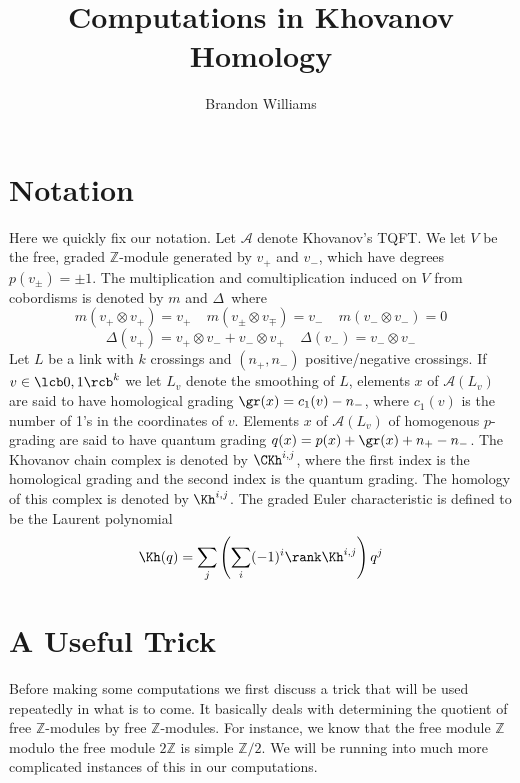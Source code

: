









\title{\Large Computations in Khovanov Homology}
\author{\large Brandon Williams}

\maketitle


\section{Notation}


Here we quickly fix our notation. Let $\mathcal A$ denote Khovanov's TQFT. We let $V$ be the free, graded $\mathbb Z$-module generated by $v_+$ and $v_-$, which have degrees $p(v_\pm) = \pm 1$. The multiplication and comultiplication induced on $V$ from cobordisms is denoted by $m$ and $\Delta$\, where
\[ m(v_+ \otimes v_+) = v_+ \ \ \ \ \ m(v_\pm \otimes v_\mp) = v_- \ \ \ \ \ m(v_- \otimes v_-) = 0 \]
\[ \Delta(v_+) = v_+ \otimes v_- + v_- \otimes v_+ \ \ \ \ \ \Delta(v_-) = v_- \otimes v_- \]
Let $L$ be a link with $k$ crossings and $(n_+,n_-)$ positive/negative crossings. If $v \in \lcb 0,1 \rcb^k$ we let $L_v$ denote the smoothing of $L$, elements $x$ of $\mathcal A(L_v)$ are said to have homological grading $\gr(x) = c_1(v) - n_-$, where $c_1(v)$ is the number of 1's in the coordinates of $v$. Elements $x$ of $\mathcal A(L_v)$ of homogenous $p$-grading are said to have quantum grading $q(x) = p(x) + \gr(x) + n_+ - n_-$. The Khovanov chain complex is denoted by $\CKh^{i,j}$, where the first index is the homological grading and the second index is the quantum grading. The homology of this complex is denoted by $\Kh^{i,j}$. The graded Euler characteristic is defined to be the Laurent polynomial
\[ \Kh(q) = \sum_j \left( \sum_i (-1)^i \rank \Kh^{i,j} \right) q^j \]



\section{A Useful Trick}


Before making some computations we first discuss a trick that will be used repeatedly in what is to come. It basically deals with determining the quotient of free $\mathbb Z$-modules by free $\mathbb Z$-modules. For instance, we know that the free module $\mathbb Z$ modulo the free module $2\mathbb Z$ is simple $\mathbb Z/2$. We will be running into much more complicated instances of this in our computations.

